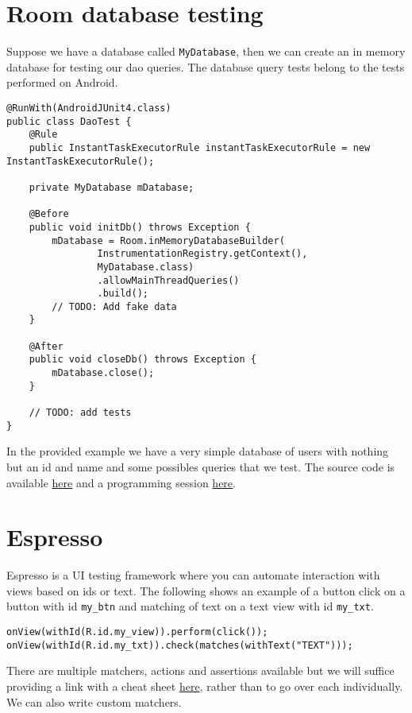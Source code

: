 \section{Room database testing}
Suppose we have a database called \texttt{MyDatabase}, then we can create an in memory database for testing our dao queries. The database query tests belong to the tests performed on Android.
\begin{lstlisting}[style=A_Java]
@RunWith(AndroidJUnit4.class)
public class DaoTest {
    @Rule
    public InstantTaskExecutorRule instantTaskExecutorRule = new InstantTaskExecutorRule();

    private MyDatabase mDatabase;

    @Before
    public void initDb() throws Exception {
        mDatabase = Room.inMemoryDatabaseBuilder(
                InstrumentationRegistry.getContext(),
                MyDatabase.class)
                .allowMainThreadQueries()
                .build();
        // TODO: Add fake data
    }

    @After
    public void closeDb() throws Exception {
        mDatabase.close();
    }

    // TODO: add tests
}
\end{lstlisting}
In the provided example we have a very simple database of users with nothing but an id and name and some possibles queries that we test. The
source code is available \href{https://github.com/JonSteinn/AndroidDevelopment/tree/master/examples/lab6/roomtest}{here} and a programming session \href{https://www.youtube.com/watch?v=aMxfgqUGnhc}{here}.

\section{Espresso}
Espresso is a UI testing framework where you can automate interaction with views based on ids or text. The following shows an example of a button click on a button with id \texttt{my\_btn} and matching of text on a text view with id \texttt{my\_txt}.
\begin{lstlisting}[style=A_Java]
onView(withId(R.id.my_view)).perform(click()); 
onView(withId(R.id.my_txt)).check(matches(withText("TEXT")));
\end{lstlisting}
There are multiple matchers, actions and assertions available but we will suffice providing a link with a cheat sheet \href{https://google.github.io/android-testing-support-library/downloads/espresso-cheat-sheet-2.1.0.pdf}{here}, rather than to go over each individually. We can also write custom matchers.\\

